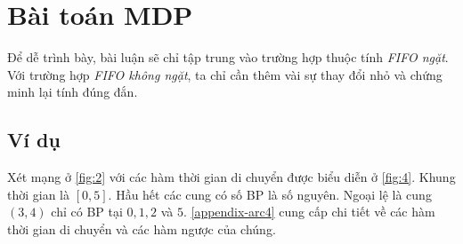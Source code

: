 \documentclass[../main.tex]{subfiles}
\begin{document}
\chapter{Bài toán MDP}\label{giux1ea3i-buxe0i-touxe1n-mdp}

Để dễ trình bày, bài luận sẽ chỉ tập trung vào trường hợp thuộc tính
\emph{FIFO ngặt}. Với trường hợp \emph{FIFO không ngặt}, ta chỉ cần thêm vài sự
thay đổi nhỏ và chứng minh lại tính đúng đắn.

\section{Ví dụ}\label{vuxed-dux1ee5}

Xét mạng ở \autoref{fig:2} với các hàm thời gian di chuyển được biểu diễn ở \autoref{fig:4}. 
Khung thời gian là \([0, 5]\). Hầu hết các cung có số BP là số
nguyên. Ngoại lệ là cung \((3, 4)\) chỉ có BP tại \(0, 1, 2\) và
\(5\). \autoref{appendix-arc4} cung cấp chi tiết về các hàm thời gian di
chuyển và các hàm ngược của chúng.
\end{document}
